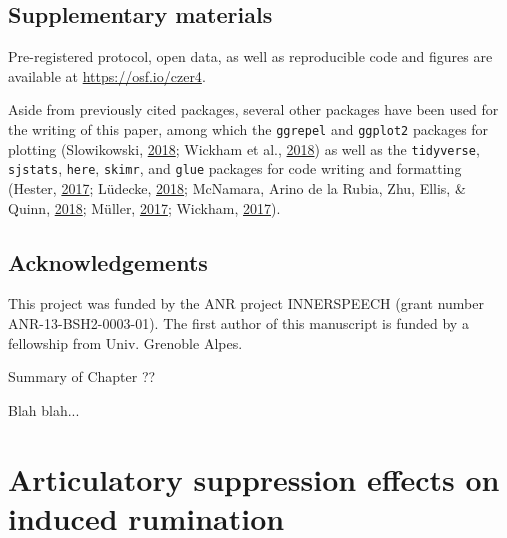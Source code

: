 \documentclass[a4paper,12pt,twoside,openright,oldfontcommands]{memoir}
\newcommand\getcurrentref[1]{
 \ifnumequal{\value{#1}}{0}
  {??}
  {\the\value{#1}}
}
\begin{document}
\hypertarget{suppCh5}{%
\section{Supplementary materials}\label{suppCh5}}

Pre-registered protocol, open data, as well as reproducible code and figures are available at \url{https://osf.io/czer4}.

Aside from previously cited packages, several other packages have been used for the writing of this paper, among which the \texttt{ggrepel} and \texttt{ggplot2} packages for plotting (Slowikowski, \protect\hyperlink{ref-R-ggrepel}{2018}; Wickham et al., \protect\hyperlink{ref-R-ggplot2}{2018}) as well as the \texttt{tidyverse}, \texttt{sjstats}, \texttt{here}, \texttt{skimr}, and \texttt{glue} packages for code writing and formatting (Hester, \protect\hyperlink{ref-R-glue}{2017}; Lüdecke, \protect\hyperlink{ref-R-sjstats}{2018}; McNamara, Arino de la Rubia, Zhu, Ellis, \& Quinn, \protect\hyperlink{ref-R-skimr}{2018}; Müller, \protect\hyperlink{ref-R-here}{2017}; Wickham, \protect\hyperlink{ref-R-tidyverse}{2017}).

\hypertarget{acknowledgements-2}{%
\section{Acknowledgements}\label{acknowledgements-2}}

This project was funded by the ANR project INNERSPEECH (grant number ANR-13-BSH2-0003-01). The first author of this manuscript is funded by a fellowship from Univ. Grenoble Alpes.

\newpage

\begin{vplace}[1]

\begin{summary}{Summary of Chapter\getcurrentref{chapter}}

Blah blah...

\end{summary}

\end{vplace}

\hypertarget{articulatory-suppression-effects-on-induced-rumination}{%
\chapter{Articulatory suppression effects on induced rumination}\label{articulatory-suppression-effects-on-induced-rumination}}
\end{document}
